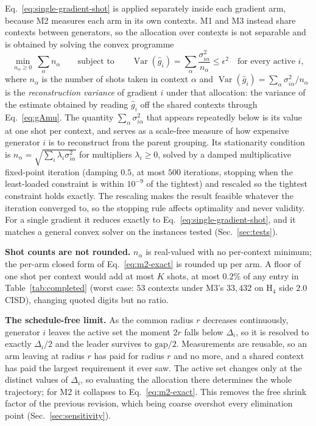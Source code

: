 \documentclass[10pt]{article}
\newcommand{\Var}{\operatorname{Var}}
\begin{document}
Eq.~\eqref{eq:single-gradient-shot} is applied separately inside each gradient arm, because M2 measures each arm in its own contexts. M1 and M3 instead share contexts between generators, so the allocation over contexts is not separable and is obtained by solving the convex programme
\begin{equation}
  \min_{n_\alpha \ge 0} \ \sum_{\alpha} n_\alpha
  \qquad\text{subject to}\qquad
  \Var(\widehat g_i)=\sum_{\alpha}\frac{\sigma_{i\alpha}^{2}}{n_\alpha}\le\epsilon^{2}
  \quad\text{for every active } i ,
  \label{eq:allocation}
\end{equation}
where $n_\alpha$ is the number of shots taken in context $\alpha$ and $\Var(\widehat g_i)=\sum_\alpha\sigma_{i\alpha}^2/n_\alpha$ is the \emph{reconstruction variance} of gradient $i$ under that allocation: the variance of the estimate obtained by reading $\widehat g_i$ off the shared contexts through Eq.~\eqref{eq:gAmu}. The quantity $\sum_\alpha\sigma_{i\alpha}^2$ that appears repeatedly below is its value at one shot per context, and serves as a scale-free measure of how expensive generator $i$ is to reconstruct from the parent grouping. Its stationarity condition is $n_\alpha=\sqrt{\sum_i\lambda_i\sigma_{i\alpha}^{2}}$ for multipliers $\lambda_i\ge0$, solved by a damped multiplicative fixed-point iteration (damping $0.5$, at most $500$ iterations, stopping when the least-loaded constraint is within $10^{-9}$ of the tightest) and rescaled so the tightest constraint holds exactly. The rescaling makes the result feasible whatever the iteration converged to, so the stopping rule affects optimality and never validity. For a single gradient it reduces exactly to Eq.~\eqref{eq:single-gradient-shot}, and it matches a general convex solver on the instances tested (Sec.~\ref{sec:tests}).

\textbf{Shot counts are not rounded.} $n_\alpha$ is real-valued with no per-context minimum; the per-arm closed form of Eq.~\eqref{eq:m2-exact} is rounded up per arm. A floor of one shot per context would add at most $K$ shots, at most $0.2\%$ of any entry in Table~\ref{tab:completed} (worst case: $53$ contexts under M3's $33{,}432$ on H$_4$ side $2.0$ CISD), changing quoted digits but no ratio.

\textbf{The schedule-free limit.} As the common radius $r$ decreases continuously, generator $i$ leaves the active set the moment $2r$ falls below $\Delta_i$, so it is resolved to exactly $\Delta_i/2$ and the leader survives to $\mathrm{gap}/2$. Measurements are reusable, so an arm leaving at radius $r$ has paid for radius $r$ and no more, and a shared context has paid the largest requirement it ever saw. The active set changes only at the distinct values of $\Delta_i$, so evaluating the allocation there determines the whole trajectory; for M2 it collapses to Eq.~\eqref{eq:m2-exact}. This removes the free shrink factor of the previous revision, which being coarse overshot every elimination point (Sec.~\ref{sec:sensitivity}).
\end{document}

